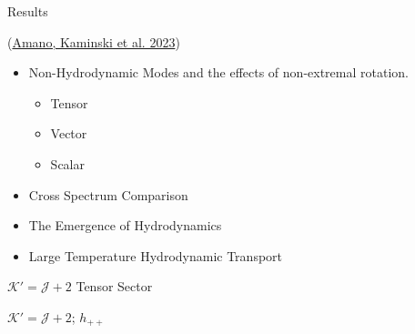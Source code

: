\documentclass[xcolor=dvipsnames]{beamer}
\begin{document}
\begin{frame}{Results}

  (\href{https://arxiv.org/abs/2308.11686}{Amano, Kaminski et al. 2023})

  \begin{itemize}
    \item Non-Hydrodynamic Modes and the effects of non-extremal rotation.
      \begin{itemize}
        \item Tensor
        \item Vector
        \item Scalar
      \end{itemize}
    \item Cross Spectrum Comparison
    \item The Emergence of Hydrodynamics
    \item Large Temperature Hydrodynamic Transport
  \end{itemize}
\end{frame}

\begin{frame}{\(\mathcal K' = \mathcal J + 2\) Tensor Sector}
  \begin{center}
  \end{center}

  \(\mathcal K' = \mathcal J + 2\); \(h_{++}\)
\end{frame}
\end{document}
